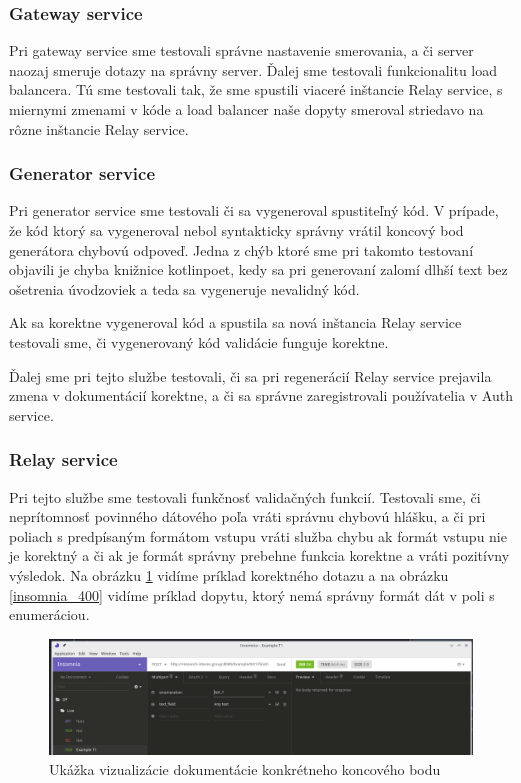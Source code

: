 \subsubsection{Gateway service}
Pri gateway service sme testovali správne nastavenie smerovania, a či server naozaj smeruje dotazy na správny server. Ďalej sme testovali funkcionalitu load balancera. Tú sme testovali tak, že sme spustili viaceré inštancie Relay service, s miernymi zmenami v kóde a load balancer naše dopyty smeroval striedavo na rôzne inštancie Relay service.

\subsubsection{Generator service}
Pri generator service sme testovali či sa vygeneroval spustiteľný kód. V prípade, že kód ktorý sa vygeneroval nebol syntakticky správny vrátil koncový bod generátora chybovú odpoveď. Jedna z chýb ktoré sme pri takomto testovaní objavili je chyba knižnice kotlinpoet, kedy sa pri generovaní zalomí dlhší text bez ošetrenia úvodzoviek a teda sa vygeneruje nevalidný kód.

Ak sa korektne vygeneroval kód a spustila sa nová inštancia Relay service testovali sme, či vygenerovaný kód validácie funguje korektne.

Ďalej sme pri tejto službe testovali, či sa pri regenerácií Relay service prejavila zmena v dokumentácií korektne, a či sa správne zaregistrovali používatelia v Auth service.

\subsubsection{Relay service}
Pri tejto službe sme testovali funkčnosť validačných funkcií. Testovali sme, či neprítomnosť povinného dátového poľa vráti správnu chybovú hlášku, a či pri poliach s predpísaným formátom vstupu vráti služba chybu ak formát vstupu nie je korektný a či ak je formát správny prebehne funkcia korektne a vráti pozitívny výsledok. Na obrázku \ref{insomnia_200} vidíme príklad korektného dotazu a na obrázku \ref{insomnia_400} vidíme príklad dopytu, ktorý nemá správny formát dát v poli s enumeráciou.

\begin{figure}[!htbp]
	\centering
	\includegraphics[width=16cm]{img/insomnia_200.png}
    \caption{Ukážka vizualizácie dokumentácie konkrétneho koncového bodu}
	\label{insomnia_200}
\end{figure}

